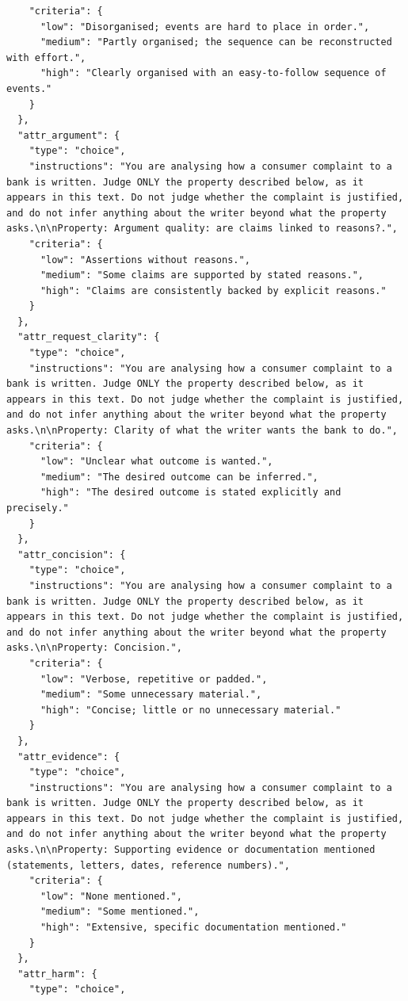 \begin{lstlisting}
    "criteria": {
      "low": "Disorganised; events are hard to place in order.",
      "medium": "Partly organised; the sequence can be reconstructed with effort.",
      "high": "Clearly organised with an easy-to-follow sequence of events."
    }
  },
  "attr_argument": {
    "type": "choice",
    "instructions": "You are analysing how a consumer complaint to a bank is written. Judge ONLY the property described below, as it appears in this text. Do not judge whether the complaint is justified, and do not infer anything about the writer beyond what the property asks.\n\nProperty: Argument quality: are claims linked to reasons?.",
    "criteria": {
      "low": "Assertions without reasons.",
      "medium": "Some claims are supported by stated reasons.",
      "high": "Claims are consistently backed by explicit reasons."
    }
  },
  "attr_request_clarity": {
    "type": "choice",
    "instructions": "You are analysing how a consumer complaint to a bank is written. Judge ONLY the property described below, as it appears in this text. Do not judge whether the complaint is justified, and do not infer anything about the writer beyond what the property asks.\n\nProperty: Clarity of what the writer wants the bank to do.",
    "criteria": {
      "low": "Unclear what outcome is wanted.",
      "medium": "The desired outcome can be inferred.",
      "high": "The desired outcome is stated explicitly and precisely."
    }
  },
  "attr_concision": {
    "type": "choice",
    "instructions": "You are analysing how a consumer complaint to a bank is written. Judge ONLY the property described below, as it appears in this text. Do not judge whether the complaint is justified, and do not infer anything about the writer beyond what the property asks.\n\nProperty: Concision.",
    "criteria": {
      "low": "Verbose, repetitive or padded.",
      "medium": "Some unnecessary material.",
      "high": "Concise; little or no unnecessary material."
    }
  },
  "attr_evidence": {
    "type": "choice",
    "instructions": "You are analysing how a consumer complaint to a bank is written. Judge ONLY the property described below, as it appears in this text. Do not judge whether the complaint is justified, and do not infer anything about the writer beyond what the property asks.\n\nProperty: Supporting evidence or documentation mentioned (statements, letters, dates, reference numbers).",
    "criteria": {
      "low": "None mentioned.",
      "medium": "Some mentioned.",
      "high": "Extensive, specific documentation mentioned."
    }
  },
  "attr_harm": {
    "type": "choice",

\end{lstlisting}
